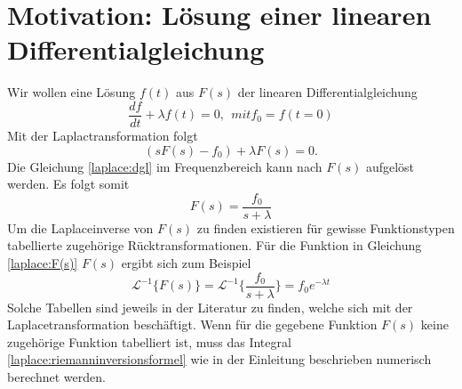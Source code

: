 %
%
%



\section{Motivation: Lösung einer linearen Differentialgleichung
\label{laplace:section:problemstellung}}
Wir wollen eine Lösung $f(t)$ aus $F(s)$ der linearen Differentialgleichung 
\begin{equation}
\frac{df}{dt} + \lambda f(t) = 0, ~~mit f_{0} = f(t=0)
\end{equation}
Mit der Laplactransformation folgt
\begin{equation}
(sF(s) - f_{0}) + \lambda F(s) = 0.
\label{laplace:dgl}
\end{equation}
Die Gleichung \eqref{laplace:dgl} im Frequenzbereich kann nach $F(s)$ aufgelöst werden.
Es folgt somit
\begin{equation}
F(s) = \frac{f_{0}}{s + \lambda}
\label{laplace:F(s)}
\end{equation}
Um die Laplaceinverse von $F(s)$ zu finden existieren für gewisse Funktionstypen tabellierte zugehörige Rücktransformationen.
Für die Funktion in Gleichung \eqref{laplace:F(s)} $F(s)$ ergibt sich zum Beispiel
\begin{equation}
\mathcal{L}^{-1}\{F(s)\}=\mathcal{L}^{-1}\{\frac{f_{0}}{s+\lambda}\} = f_{0}e^{-\lambda t}
\end{equation}
Solche Tabellen sind jeweils in der Literatur zu finden, welche sich mit der Laplacetransformation beschäftigt.
Wenn für die gegebene Funktion $F(s)$ keine zugehörige Funktion tabelliert ist, muss das Integral \eqref{laplace:riemanninversionsformel} wie in der Einleitung beschrieben numerisch berechnet werden.

